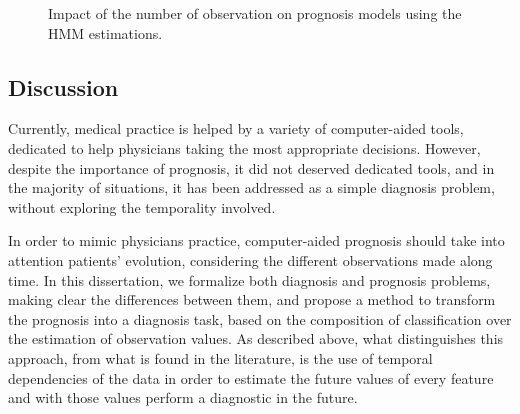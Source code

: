  \begin{figure}[h]
 	\begin{subfigmatrix}{2}
 	\end{subfigmatrix}
 	\caption{Impact of the number of observation on prognosis models using the HMM estimations.}
 	\label{fig:impactobservationshmm}
 \end{figure}

\subsection{Discussion}
\label{subsection:discussion}

Currently, medical practice is helped by a variety of computer-aided tools, dedicated to help physicians taking the most
 appropriate decisions. However, despite the importance of prognosis, it did not deserved dedicated tools, and in the majority 
 of situations, it has been addressed as a simple diagnosis problem, without exploring the temporality involved.

In order to mimic physicians practice, computer-aided prognosis should take into attention patients’ evolution, considering the 
different observations made along time. In this dissertation, we formalize both diagnosis and prognosis problems, making clear the
 differences between them, and propose a method to transform the prognosis into a diagnosis task, based on the composition
 of classification over the estimation of observation values. As described above, what distinguishes this approach, from what 
 is found in the literature, is the use of temporal dependencies of the data in order to estimate the future values of every 
 feature and with those values perform a diagnostic in the future. 
 
